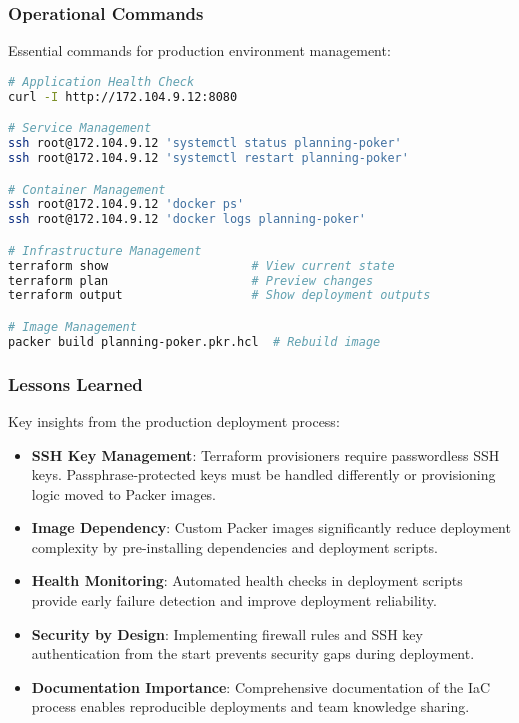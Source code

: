 \documentclass[11pt,a4paper]{article}
\begin{document}
\subsubsection{Operational Commands}

Essential commands for production environment management:

\begin{lstlisting}[language=bash, caption=Production Management Commands]
# Application Health Check
curl -I http://172.104.9.12:8080

# Service Management
ssh root@172.104.9.12 'systemctl status planning-poker'
ssh root@172.104.9.12 'systemctl restart planning-poker'

# Container Management  
ssh root@172.104.9.12 'docker ps'
ssh root@172.104.9.12 'docker logs planning-poker'

# Infrastructure Management
terraform show                    # View current state
terraform plan                    # Preview changes
terraform output                  # Show deployment outputs

# Image Management
packer build planning-poker.pkr.hcl  # Rebuild image
\end{lstlisting}

\subsubsection{Lessons Learned}

Key insights from the production deployment process:

\begin{itemize}
    \item \textbf{SSH Key Management}: Terraform provisioners require passwordless SSH keys. Passphrase-protected keys must be handled differently or provisioning logic moved to Packer images.
    \item \textbf{Image Dependency}: Custom Packer images significantly reduce deployment complexity by pre-installing dependencies and deployment scripts.
    \item \textbf{Health Monitoring}: Automated health checks in deployment scripts provide early failure detection and improve deployment reliability.
    \item \textbf{Security by Design}: Implementing firewall rules and SSH key authentication from the start prevents security gaps during deployment.
    \item \textbf{Documentation Importance}: Comprehensive documentation of the IaC process enables reproducible deployments and team knowledge sharing.
\end{itemize}
\end{document}
